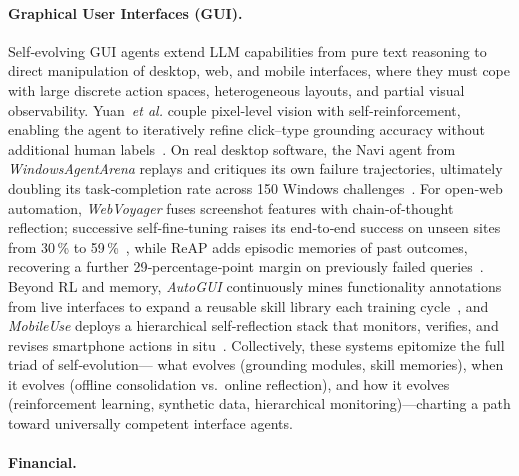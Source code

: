 \documentclass[10pt]{article} %
\begin{document}
\paragraph{Graphical User Interfaces (GUI).}
Self‑evolving GUI agents extend LLM capabilities from pure text reasoning to direct manipulation of desktop, web, and mobile interfaces, where they must cope with large discrete action spaces, heterogeneous layouts, and partial visual observability. Yuan~\textit{et al.} couple pixel‑level vision with self‑reinforcement, enabling the agent to iteratively refine click–type grounding accuracy without additional human labels~\citep{yuan2025enhancing}.  On real desktop software, the Navi agent from \textit{WindowsAgentArena} replays and critiques its own failure trajectories, ultimately doubling its task‑completion rate across 150 Windows challenges~\citep{bonatti2024windows}.  For open‑web automation, \textit{WebVoyager} fuses screenshot features with chain‑of‑thought reflection; successive self‑fine‑tuning raises its end‑to‑end success on unseen sites from 30\,\% to 59\,\%~\citep{he2024webvoyager}, while ReAP adds episodic memories of past outcomes, recovering a further 29‑percentage‑point margin on previously failed queries~\citep{azam2025reap}.  Beyond RL and memory, \textit{AutoGUI} continuously mines functionality annotations from live interfaces to expand a reusable skill library each training cycle~\citep{li2025autogui}, and \textit{MobileUse} deploys a hierarchical self‑reflection stack that monitors, verifies, and revises smartphone actions in situ~\citep{wu2025mobileuse}.  Collectively, these systems epitomize the full triad of self‑evolution— what evolves (grounding modules, skill memories), when it evolves (offline consolidation vs.\ online reflection), and how it evolves (reinforcement learning, synthetic data, hierarchical monitoring)—charting a path toward universally competent interface agents. 



\paragraph{Financial.}
\end{document}

